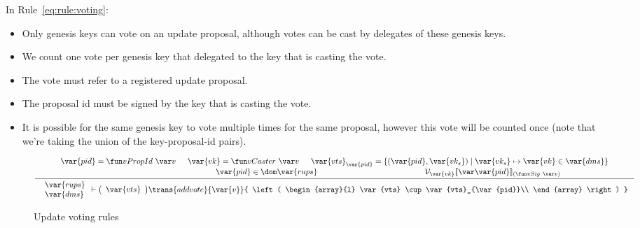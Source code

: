 In Rule~\ref{eq:rule:voting}:
\begin{itemize}
\item Only genesis keys can vote on an update proposal, although votes can be
  cast by delegates of these genesis keys.
\item We count one vote per genesis key that delegated to the key that is
  casting the vote.
\item The vote must refer to a registered update proposal.
\item The proposal id must be signed by the key that is casting the vote.
\item It is possible for the same genesis key to vote multiple times for
  the same proposal, however this vote will be counted once (note that we're
  taking the union of the key-proposal-id pairs).
\end{itemize}

\begin{figure}[htb]
  \begin{equation}
    \label{eq:rule:voting}
    \inference
    {
      \var{pid} = \vPropId{v} & \var{vk} = \vCaster{v} &
      \var{vts}_{\var{pid}} =
      \{ (\var{pid}, \var{vk_s}) \mid \var{vk_s} \mapsto \var{vk} \in \var{dms} \}\\
      & \var{pid} \in \dom \var{rups} &
      \mathcal{V}_{\var{vk}}\serialised{\var{pid}}_{(\vSig{v})}\\
    }
    {
      {
        \begin{array}{l}
          \var{rups}\\
          \var{dms}
        \end{array}
      }
      \vdash
      {
        \left(
          \begin{array}{l}
            \var{vts}
          \end{array}
        \right)
      }
      \trans{addvote}{\var{v}}
      {
        \left(
          \begin{array}{l}
            \var{vts} \cup \var{vts}_{\var{pid}}\\
          \end{array}
        \right)
      }
    }
  \end{equation}
  \caption{Update voting rules}
  \label{fig:rules:voting}
\end{figure}

\clearpage

